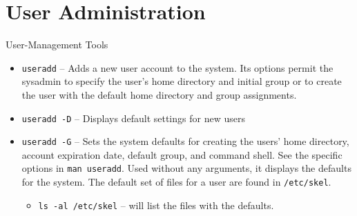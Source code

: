 \documentclass[14pt,aspectratio=1610]{beamer}
\begin{document}


\section{User Administration}
\begin{frame}{User-Management Tools}
\begin{itemize}
\item \lstinline{useradd} -- Adds a new user account to the system. Its options permit the sysadmin to specify the user's home directory and initial group or to create the user with the default home directory and group assignments.
\item \lstinline{useradd -D} -- Displays default settings for new users
\item \lstinline{useradd -G} -- Sets the system defaults for creating the users' home directory, account expiration date, default group, and command shell. See the specific options in \lstinline{man useradd}. Used without any arguments, it displays the defaults for the system. The default set of files for a user are found in \texttt{/etc/skel}.
\begin{itemize}
\item \lstinline{ls -al /etc/skel} -- will list the files with the defaults.
\end{itemize}
\end{itemize}
\end{frame}
\end{document}
